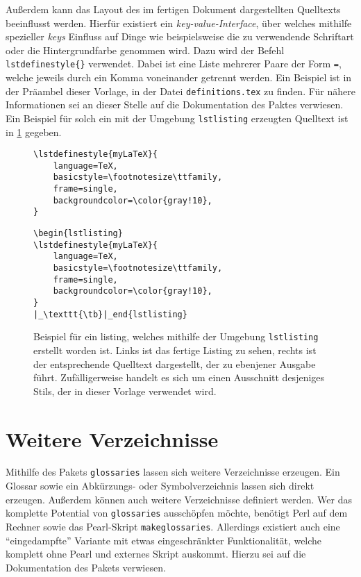 Außerdem kann das Layout des im fertigen Dokument dargestellten Quelltexts beeinflusst werden. Hierfür existiert ein \emph{key-value-Interface}, über welches
mithilfe spezieller \emph{keys} Einfluss auf Dinge wie beispielsweise die
zu verwendende Schriftart oder die Hintergrundfarbe genommen wird. Dazu
wird der Befehl \texttt{\tb lstdefinestyle\{\}} verwendet.
Dabei ist  eine Liste mehrerer Paare der Form \texttt{=}, welche jeweils durch ein Komma voneinander getrennt werden. Ein Beispiel ist in der Präambel dieser Vorlage, in der Datei \texttt{definitions.tex} zu finden. Für nähere Informationen sei an dieser Stelle auf die Dokumentation des Paktes verwiesen. Ein Beispiel für solch ein mit der Umgebung \texttt{lstlisting} erzeugten Quelltext ist in \cref{fig:listing} gegeben.
%
\begin{figure}[htb]
	\centering
	\begin{minipage}{.485\textwidth}
		\begin{lstlisting}
\lstdefinestyle{myLaTeX}{
	language=TeX,
	basicstyle=\footnotesize\ttfamily,
	frame=single,
	backgroundcolor=\color{gray!10},
}
		\end{lstlisting}
	\end{minipage}
	\hfill
	\begin{minipage}{.485\textwidth}
		\begin{lstlisting}[style=myBasic]
\begin{lstlisting}
\lstdefinestyle{myLaTeX}{
	language=TeX,
	basicstyle=\footnotesize\ttfamily,
	frame=single,
	backgroundcolor=\color{gray!10},
}
|_\texttt{\tb}|_end{lstlisting}
		\end{lstlisting}
	\end{minipage}
	\caption[Beispiel für ein listing]{%
		Beispiel für ein listing, welches mithilfe der Umgebung
		\texttt{lstlisting} erstellt worden ist. Links ist das fertige
		Listing zu sehen, rechts ist der entsprechende Quelltext dargestellt,
		der zu ebenjener Ausgabe führt. Zufälligerweise handelt es sich um
		einen Ausschnitt desjeniges Stils, der in dieser Vorlage verwendet 
		wird.
	}\label{fig:listing}
\end{figure}
%
%
\section{Weitere Verzeichnisse}
Mithilfe des Pakets \texttt{glossaries} lassen sich weitere Verzeichnisse
erzeugen. Ein Glossar sowie ein Abkürzungs- oder Symbolverzeichnis lassen
sich direkt erzeugen. Außerdem können auch weitere Verzeichnisse definiert
werden. Wer das komplette Potential von \texttt{glossaries} ausschöpfen
möchte, benötigt Perl auf dem Rechner sowie das Pearl-Skript 
\texttt{makeglossaries}. Allerdings existiert auch eine 
\enquote{eingedampfte} Variante mit etwas eingeschränkter Funktionalität,
welche komplett ohne Pearl und externes Skript auskommt. Hierzu sei auf die
Dokumentation des Pakets verwiesen.

